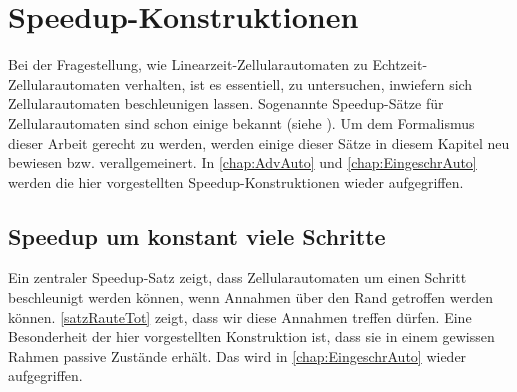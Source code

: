 \chapter{Speedup-Konstruktionen}
\label{chap:SpeedupKonstr}

Bei der Fragestellung, wie Linearzeit-Zellularautomaten zu Echtzeit-Zellularautomaten verhalten,
ist es essentiell, zu untersuchen, inwiefern sich Zellularautomaten beschleunigen lassen.
Sogenannte Speedup-Sätze für Zellularautomaten sind schon einige bekannt (siehe \cite{Kutrib2009, MAZOYER199259}).
Um dem Formalismus dieser Arbeit gerecht zu werden, werden einige dieser Sätze in diesem Kapitel neu bewiesen \acs{bzw.} verallgemeinert.
In \cref{chap:AdvAuto} und \cref{chap:EingeschrAuto} werden die hier vorgestellten Speedup-Konstruktionen wieder aufgegriffen.

\section{Speedup um konstant viele Schritte}

Ein zentraler Speedup-Satz zeigt, dass Zellularautomaten um einen Schritt beschleunigt werden können,
wenn Annahmen über den Rand getroffen werden können. \cref{satzRauteTot} zeigt, dass wir diese Annahmen treffen dürfen.
Eine Besonderheit der hier vorgestellten Konstruktion ist, dass sie in einem gewissen Rahmen passive Zustände erhält.
Das wird in \cref{chap:EingeschrAuto} wieder aufgegriffen.


